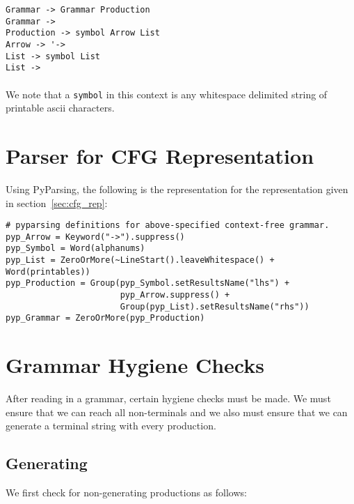 \documentclass{article}
\begin{document}
\begin{verbatim}
Grammar -> Grammar Production
Grammar -> 
Production -> symbol Arrow List
Arrow -> '->
List -> symbol List
List -> 
\end{verbatim}

\paragraph{} We note that a \verb_symbol_ in this context is any 
whitespace delimited string of printable ascii characters.

\section{Parser for CFG Representation}
\label{sec:parser}
Using PyParsing, the following is the representation for the representation
given in section~\ref{sec:cfg_rep}:

\begin{verbatim}
# pyparsing definitions for above-specified context-free grammar.
pyp_Arrow = Keyword("->").suppress()
pyp_Symbol = Word(alphanums)
pyp_List = ZeroOrMore(~LineStart().leaveWhitespace() + Word(printables))
pyp_Production = Group(pyp_Symbol.setResultsName("lhs") +
                       pyp_Arrow.suppress() +
                       Group(pyp_List).setResultsName("rhs"))
pyp_Grammar = ZeroOrMore(pyp_Production)
\end{verbatim}
\label{exerpt:parser}

\section{Grammar Hygiene Checks}
\label{sec:hygiene}
After reading in a grammar, certain hygiene checks must be made. We
must ensure that we can reach all non-terminals and we also must
ensure that we can generate a terminal string with every production.

\subsection{Generating}
We first check for non-generating productions as follows:
\end{document}
